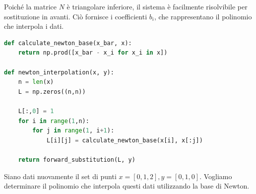\documentclass{article}
\begin{document}
Poiché la matrice $N$ è triangolare inferiore, il sistema è facilmente
risolvibile per sostituzione in avanti. Ciò fornisce i coefficienti $b_i$, che
rappresentano il polinomio che interpola i dati.
\begin{lstlisting}[language=Python]
def calculate_newton_base(x_bar, x):
    return np.prod([x_bar - x_i for x_i in x])

def newton_interpolation(x, y):
    n = len(x)
    L = np.zeros((n,n))
    
    L[:,0] = 1
    for i in range(1,n):
        for j in range(1, i+1):
            L[i][j] = calculate_newton_base(x[i], x[:j])
            
    return forward_substitution(L, y)
\end{lstlisting}
\begin{example}
    Siano dati nuovamente il set di punti $x=[0,1,2],y=[0,1,0]$. Vogliamo
    determinare il polinomio che interpola questi dati utilizzando la base di
    Newton.


\end{example}
\end{document}
